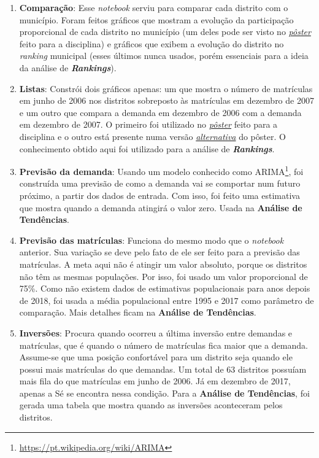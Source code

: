\documentclass[12pt, a4paper]{article}
\begin{document}
\begin{enumerate}
	\item \textbf{Comparação}: Esse \textit{notebook} serviu para comparar cada distrito com o município. Foram feitos gráficos que mostram a evolução da participação proporcional de cada distrito no município (um deles pode ser visto no \href{https://lsflp.github.io/MAC0213/poster/poster_a1.pdf}{\textit{pôster}} feito para a disciplina) e gráficos que exibem a evolução do distrito no \textit{ranking} municipal (esses últimos nunca usados, porém essenciais para a ideia da análise de \textbf{\textit{Rankings}}).
	\item \textbf{Listas}: Constrói dois gráficos apenas: um que mostra o número de matrículas em junho de 2006 nos distritos sobreposto às matrículas em dezembro de 2007 e um outro que compara a demanda em dezembro de 2006 com a demanda em dezembro de 2007. O primeiro foi utilizado no \href{https://lsflp.github.io/MAC0213/poster/poster_a1.pdf}{\textit{pôster}} feito para a disciplina e o outro está presente numa versão \href{https://lsflp.github.io/MAC0213/poster/poster_a0.pdf}{\textit{alternativa}} do pôster. O conhecimento obtido aqui foi utilizado para a análise de \textbf{\textit{Rankings}}.
	\item \textbf{Previsão da demanda}: Usando um modelo conhecido como ARIMA\footnote{\url{https://pt.wikipedia.org/wiki/ARIMA}}, foi construída uma previsão de como a demanda vai se comportar num futuro próximo, a partir dos dados de entrada. Com isso, foi feito uma estimativa que mostra quando a demanda atingirá o valor zero. Usada na \textbf{Análise de Tendências}.
	\item \textbf{Previsão das matrículas}: Funciona do mesmo modo que o \textit{notebook} anterior. Sua variação se deve pelo fato de ele ser feito para a previsão das matrículas. A meta aqui não é atingir um valor absoluto, porque os distritos não têm as mesmas populações. Por isso, foi usado um valor proporcional de 75\%. Como não existem dados de estimativas populacionais para anos depois de 2018, foi usada a média populacional entre 1995 e 2017 como parâmetro de comparação. Mais detalhes ficam na \textbf{Análise de Tendências}.
	\item \textbf{Inversões}: Procura quando ocorreu a última inversão entre demandas e matrículas, que é quando o número de matrículas fica maior que a demanda. Assume-se que uma posição confortável para um distrito seja quando ele possui mais matrículas do que demandas. Um total de 63 distritos possuíam mais fila do que matrículas em junho de 2006. Já em dezembro de 2017, apenas a Sé se encontra nessa condição. Para a \textbf{Análise de Tendências}, foi gerada uma tabela que mostra quando as inversões aconteceram pelos distritos.
\end{enumerate}
\end{document}

